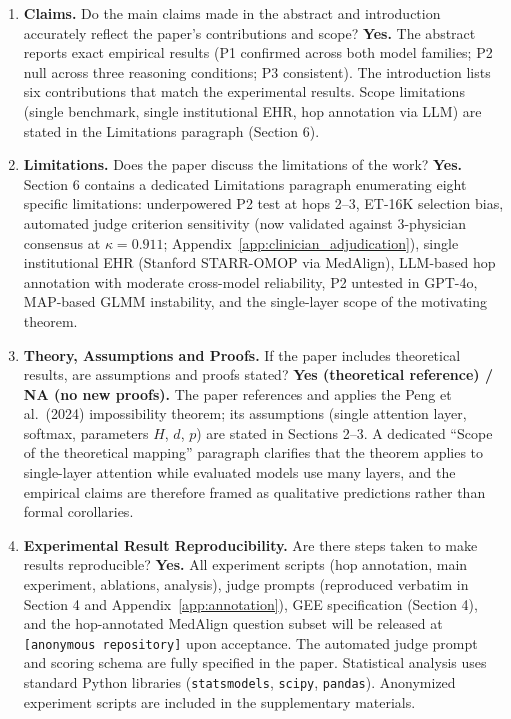 \documentclass{article}
\begin{document}
\begin{enumerate}

\item \textbf{Claims.}
Do the main claims made in the abstract and introduction accurately reflect
the paper's contributions and scope?
\textbf{Yes.} The abstract reports exact empirical results (P1 confirmed
across both model families; P2 null across three reasoning conditions; P3
consistent). The introduction lists six contributions that match the
experimental results. Scope limitations (single benchmark, single
institutional EHR, hop annotation via LLM) are stated in the Limitations
paragraph (Section 6).

\item \textbf{Limitations.}
Does the paper discuss the limitations of the work?
\textbf{Yes.} Section 6 contains a dedicated Limitations paragraph
enumerating eight specific limitations: underpowered P2 test at hops 2--3,
ET-16K selection bias, automated judge criterion sensitivity (now validated
against 3-physician consensus at $\kappa = 0.911$; Appendix~\ref{app:clinician_adjudication}),
single institutional EHR (Stanford STARR-OMOP via MedAlign), LLM-based hop
annotation with moderate cross-model reliability, P2 untested in GPT-4o,
MAP-based GLMM instability, and the single-layer scope of the motivating
theorem.

\item \textbf{Theory, Assumptions and Proofs.}
If the paper includes theoretical results, are assumptions and proofs stated?
\textbf{Yes (theoretical reference) / NA (no new proofs).}
The paper references and applies the Peng et al.\ (2024) impossibility
theorem; its assumptions (single attention layer, softmax, parameters $H$,
$d$, $p$) are stated in Sections 2--3. A dedicated ``Scope of the
theoretical mapping'' paragraph clarifies that the theorem applies to
single-layer attention while evaluated models use many layers, and the
empirical claims are therefore framed as qualitative predictions rather
than formal corollaries.

\item \textbf{Experimental Result Reproducibility.}
Are there steps taken to make results reproducible?
\textbf{Yes.} All experiment scripts (hop annotation, main experiment,
ablations, analysis), judge prompts (reproduced verbatim in Section 4 and
Appendix~\ref{app:annotation}), GEE specification (Section 4), and the
hop-annotated MedAlign question subset will be released at
\texttt{[anonymous repository]} upon acceptance. The automated judge prompt
and scoring schema are fully specified in the paper. Statistical analysis
uses standard Python libraries (\texttt{statsmodels}, \texttt{scipy},
\texttt{pandas}). Anonymized experiment scripts are included in the
supplementary materials.


\end{enumerate}
\end{document}
